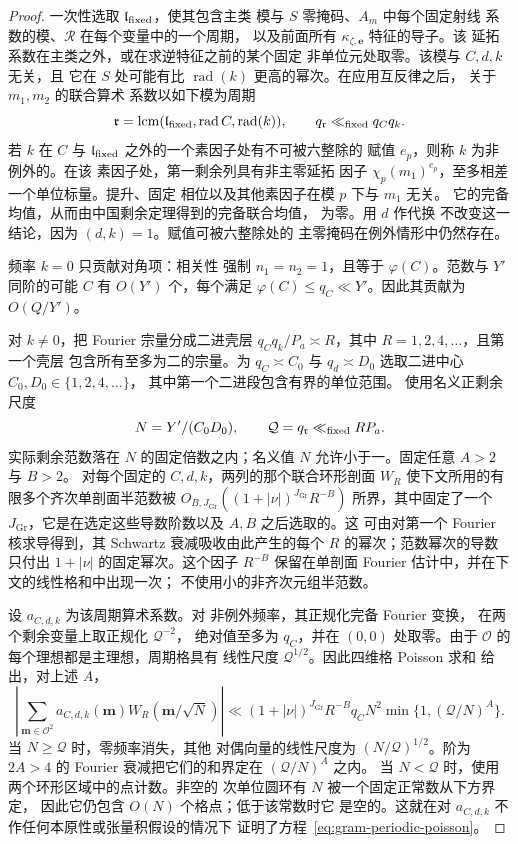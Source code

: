\documentclass[11pt,a4paper]{article}
\numberwithin{equation}{section}
\numberwithin{figure}{section}
\theoremstyle{definition}
\theoremstyle{remark}
\begin{document}
\begin{proof}
一次性选取 $\mathfrak l_{\rm fixed}$，使其包含主类
模与 $S$ 零掩码、$A_m$ 中每个固定射线
系数的模、$\mathcal R$ 在每个变量中的一个周期，
以及前面所有
$\kappa_{\zeta,\boldsymbol e}$ 特征的导子。该
延拓系数在主类之外，或在求逆特征之前的某个固定
非单位元处取零。该模与 $C,d,k$ 无关，且
它在 $S$ 处可能有比 $\operatorname{rad}(k)$ 更高的幂次。在应用互反律之后，
关于 $m_1,m_2$ 的联合算术
系数以如下模为周期
\[
 \mathfrak r=\operatorname{lcm}
   (\mathfrak l_{\rm fixed},\operatorname{rad}C,\operatorname{rad}(k)),
 \qquad q_{\mathfrak r}\ll_{\rm fixed}q_Cq_k.
\]
若 $k$ 在 $C$ 与 $\mathfrak l_{\rm fixed}$ 之外的一个素因子处有不可被六整除的
赋值 $e_p$，则称 $k$ 为非例外的。在该
素因子处，第一剩余列具有非主零延拓
因子 $\chi_p(m_1)^{e_p}$，至多相差一个单位标量。提升、固定
相位以及其他素因子在模 $p$ 下与 $m_1$ 无关。
它的完备均值，从而由中国剩余定理得到的完备联合均值，
为零。用 $d$ 作代换
不改变这一结论，因为 $(d,k)=1$。赋值可被六整除处的
主零掩码在例外情形中仍然存在。

频率 $k=0$ 只贡献对角项：相关性
强制 $n_1=n_2=1$，且等于 $\varphi(C)$。范数与 $Y'$
同阶的可能 $C$ 有 $O(Y')$ 个，每个满足
$\varphi(C)\le q_C\ll Y'$。因此其贡献为
$O(Q/Y')$。

对 $k\ne0$，把 Fourier 宗量分成二进壳层
$q_Cq_k/P_a\asymp R$，其中 $R=1,2,4,\ldots$，且第一个壳层
包含所有至多为二的宗量。为 $q_C\asymp C_0$ 与
$q_d\asymp D_0$ 选取二进中心 $C_0,D_0\in\{1,2,4,\ldots\}$，
其中第一个二进段包含有界的单位范围。
使用名义正剩余尺度
\[
 N=Y'/(C_0D_0),\qquad
 \mathcal Q=q_{\mathfrak r}\ll_{\rm fixed}RP_a.
\]
实际剩余范数落在 $N$ 的固定倍数之内；名义值
$N$ 允许小于一。固定任意 $A>2$ 与 $B>2$。
对每个固定的 $C,d,k$，两列的那个联合环形剖面 $W_R$
使下文所用的有限多个齐次单剖面半范数被
$O_{B,J_{\mathrm{Gr}}}((1+|\nu|)^{J_{\mathrm{Gr}}} R^{-B})$ 所界，其中固定了一个
$J_{\mathrm{Gr}}$，它是在选定这些导数阶数以及 $A,B$ 之后选取的。这
可由对第一个 Fourier 核求导得到，其 Schwartz 衰减吸收由此产生的每个
$R$ 的幂次；范数幂次的导数只付出
$1+|\nu|$ 的固定幂次。这个因子 $R^{-B}$ 保留在单剖面
Fourier 估计中，并在下文的线性格和中出现一次；
不使用小的非齐次元组半范数。

设 $a_{C,d,k}$ 为该周期算术系数。对
非例外频率，其正规化完备 Fourier 变换，
在两个剩余变量上取正规化 $\mathcal Q^{-2}$，
绝对值至多为 $q_C$，并在 $(0,0)$ 处取零。由于
$\mathcal O$ 的每个理想都是主理想，周期格具有
线性尺度 $\mathcal Q^{1/2}$。因此四维格 Poisson 求和
给出，对上述 $A$，
\begin{equation}
 \left|\sum_{\mathbf m\in\mathcal O^2}
       a_{C,d,k}(\mathbf m)W_R(\mathbf m/\sqrt N)\right|
 \ll (1+|\nu|)^{J_{\mathrm{Gr}}} R^{-B}q_C N^2
             \min\{1,(\mathcal Q/N)^A\}.
 \label{eq:gram-periodic-poisson}
\end{equation}
当 $N\ge\mathcal Q$ 时，零频率消失，其他
对偶向量的线性尺度为 $(N/\mathcal Q)^{1/2}$。阶为
$2A>4$ 的 Fourier
衰减把它们的和界定在 $(\mathcal Q/N)^A$ 之内。
当 $N<\mathcal Q$ 时，使用两个环形区域中的点计数。非空的
次单位圆环有 $N$ 被一个固定正常数从下方界定，
因此它仍包含 $O(N)$ 个格点；低于该常数时它
是空的。这就在对 $a_{C,d,k}$ 不作任何本原性或张量积假设的情况下
证明了方程~\eqref{eq:gram-periodic-poisson}。


\end{proof}
\end{document}
